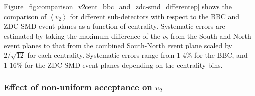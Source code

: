 \documentclass[aps,prc,superscriptaddress,showpacs,floatfix,twocolumn]{revtex4}
\begin{document}
Figure~\ref{fig:comparison_v2cent_bbc_and_zdc-smd_differentep} shows the comparison of $\left<v_2\right>$ 
for different sub-detectors with respect to the BBC and ZDC-SMD event planes as a function of 
centrality. Systematic errors are estimated by taking the maximum difference of the $v_2$ from the
South and North event planes to that from the combined South-North event plane scaled by $2/\sqrt{12}$ 
for each centrality. Systematic errors range from 1-4\% for the BBC, and 1-16\% for the ZDC-SMD 
event planes depending on the centrality bins.
 
\subsubsection{Effect of non-uniform acceptance on $v_2$}
\label{subsubsec:syserror_nonuniform_acceptance}
\end{document}
